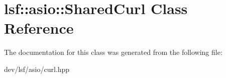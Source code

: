 \hypertarget{classlsf_1_1asio_1_1SharedCurl}{
\section{lsf::asio::SharedCurl Class Reference}
\label{classlsf_1_1asio_1_1SharedCurl}
}


The documentation for this class was generated from the following file:\begin{DoxyCompactItemize}
\item 
dev/lsf/asio/curl.hpp\end{DoxyCompactItemize}
